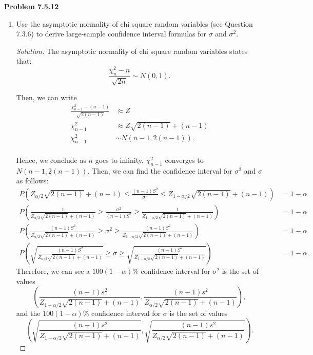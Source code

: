 \documentclass{article}
\begin{document}
\newpage
\textbf{Problem 7.5.12}
\begin{enumerate}[label=(\alph*)]
    \item 
    Use the asymptotic normality of chi square random variables (see Question 7.3.6) to derive large-sample confidence interval formulas for $\sigma$ and $\sigma^2$.
    \begin{proof}[Solution]
        The asymptotic normality of chi square random variables states that:
        $$\frac{\chi^2_n - n}{\sqrt{2n}} \sim N(0,1).$$

        Then, we can write
        \begin{align*}
            \frac{\chi^2_{n-1}-(n-1)}{\sqrt{2(n-1)}} & \approx Z \\
            \chi^2_{n-1} & \approx Z\sqrt{2(n-1)}+(n-1) \\
            \chi^2_{n-1} & \sim N(n-1, 2(n-1)). \\
        \end{align*}

        Hence, we conclude as $n$ goes to infinity, $\chi^2_{n-1}$ converges to $N(n-1, 2(n-1))$.
        Then, we can find the confidence interval for $\sigma^2$ and $\sigma$ as follows:
        \begin{align*}
            P\left(Z_{\alpha/2}\sqrt{2(n-1)}+(n-1)\le \frac{(n-1)S^2}{\sigma^2} \le Z_{1-\alpha/2}\sqrt{2(n-1)}+(n-1)\right) &= 1-\alpha \\
            P\left(\frac{1}{Z_{\alpha/2}\sqrt{2(n-1)}+(n-1)}\ge \frac{\sigma^2}{(n-1)S^2} \ge \frac{1}{Z_{1-\alpha/2}\sqrt{2(n-1)}+(n-1)}\right) &= 1-\alpha \\
            P\left(\frac{(n-1)S^2}{Z_{\alpha/2}\sqrt{2(n-1)}+(n-1)}\ge \sigma^2 \ge \frac{(n-1)S^2}{Z_{1-\alpha/2}\sqrt{2(n-1)}+(n-1)}\right) &= 1-\alpha \\ 
            P\left(\sqrt{\frac{(n-1)S^2}{Z_{\alpha/2}\sqrt{2(n-1)}+(n-1)}}\ge \sigma \ge \sqrt{\frac{(n-1)S^2}{Z_{1-\alpha/2}\sqrt{2(n-1)}+(n-1)}}\right) &= 1-\alpha.
        \end{align*}
        Therefore, we can see a $100(1-\alpha)\%$ confidence interval for $\sigma^2$ is the set of values $$\left(\frac{(n-1)s^2}{Z_{1-\alpha/2}\sqrt{2(n-1)}+(n-1)}, \frac{(n-1)s^2}{Z_{\alpha/2}\sqrt{2(n-1)}+(n-1)}\right),$$
        and the $100(1-\alpha)\%$ confidence interval for $\sigma$ is the set of values $$\left(\sqrt{\frac{(n-1)s^2}{Z_{1-\alpha/2}\sqrt{2(n-1)}+(n-1)}}, \sqrt{\frac{(n-1)s^2}{Z_{\alpha/2}\sqrt{2(n-1)}+(n-1)}}\right).$$
    \end{proof}
    

\end{enumerate}
\end{document}
